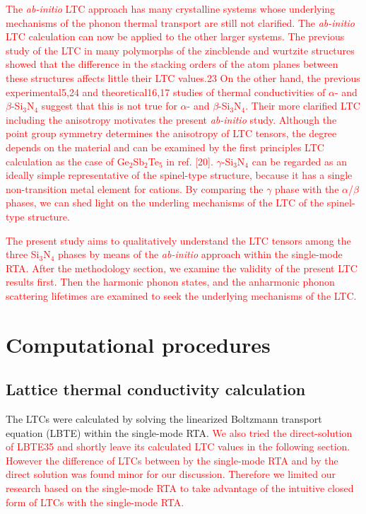 \documentclass[twocolumn,amsmath,amssymb,a4paper,prb,superscriptaddress,floatfix]{revtex4-1}
\begin{document}
\textcolor{red}{The {\it ab-initio} LTC approach has many crystalline
systems whose underlying mechanisms of the phonon thermal transport are
still not clarified. The {\it ab-initio} LTC calculation can now be
applied to the other larger systems. The previous study of the LTC in
many polymorphs of the zincblende and wurtzite structures showed that
the difference in the stacking orders of the atom planes between these
structures affects little their LTC values.23 On the other hand, the
previous experimental5,24 and theoretical16,17 studies of thermal
conductivities of $\alpha$- and $\beta$-Si$_3$N$_4$ suggest that this is
not true for $\alpha$- and $\beta$-Si$_3$N$_4$. Their more clarified LTC
including the anisotropy motivates the present {\it ab-initio}
study. Although the point group symmetry determines the anisotropy of
LTC tensors, the degree depends on the material and can be examined by
the first principles LTC calculation as the case of Ge$_2$Sb$_2$Te$_5$
in ref. [20]. $\gamma$-Si$_3$N$_4$ can be regarded as an ideally simple
representative of the spinel-type structure, because it has a single
non-transition metal element for cations. By comparing the $\gamma$
phase with the $\alpha$/$\beta$ phases, we can shed light on the
underling mechanisms of the LTC of the spinel-type structure.}

\textcolor{red}{The present study aims to qualitatively understand the
LTC tensors among the three Si$_3$N$_4$ phases by means of the {\it
ab-initio} approach within the single-mode RTA. After the methodology
section, we examine the validity of the present LTC results first. Then
the harmonic phonon states, and the anharmonic phonon scattering
lifetimes are examined to seek the underlying mechanisms of the LTC.}

\section{Computational procedures}
\subsection{Lattice thermal conductivity calculation}
The LTCs were calculated by solving the linearized Boltzmann
transport equation (LBTE) within the single-mode RTA.
%
\textcolor{red}{We also tried the direct-solution of LBTE35 and shortly
leave its calculated LTC values in the following section. However the
difference of LTCs between by the single-mode RTA and by the direct
solution was found minor for our discussion. Therefore we limited our
research based on the single-mode RTA to take advantage of the intuitive
closed form of LTCs with the single-mode RTA.}
\end{document}
